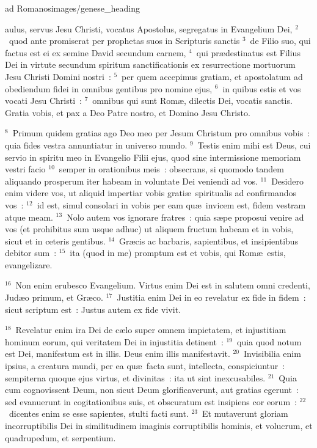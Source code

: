 {ad Romanos}{images/genese_heading}


\bchapter
{}aulus, servus Jesu Christi, vocatus Apostolus, segregatus in Evangelium Dei,
${}^{2}$~quod ante promiserat per prophetas suos in Scripturis sanctis
${}^{3}$~de Filio suo, qui factus est ei ex semine David secundum carnem,
${}^{4}$~qui pr\ae destinatus est Filius Dei in virtute secundum spiritum sanctificationis ex resurrectione mortuorum Jesu Christi Domini nostri~:
${}^{5}$~per quem accepimus gratiam, et apostolatum ad obediendum fidei in omnibus gentibus pro nomine ejus,
${}^{6}$~in quibus estis et vos vocati Jesu Christi~:
${}^{7}$~omnibus qui sunt Rom\ae , dilectis Dei, vocatis sanctis. Gratia vobis, et pax a Deo Patre nostro, et Domino Jesu Christo.


${}^{8}$~Primum quidem gratias ago Deo meo per Jesum Christum pro omnibus vobis~: quia fides vestra annuntiatur in universo mundo.
${}^{9}$~Testis enim mihi est Deus, cui servio in spiritu meo in Evangelio Filii ejus, quod sine intermissione memoriam vestri facio
${}^{10}$~semper in orationibus meis~: obsecrans, si quomodo tandem aliquando prosperum iter habeam in voluntate Dei veniendi ad vos.
${}^{11}$~Desidero enim videre vos, ut aliquid impertiar vobis grati\ae\ spiritualis ad confirmandos vos~:
${}^{12}$~id est, simul consolari in vobis per eam qu\ae\ invicem est, fidem vestram atque meam.
${}^{13}$~Nolo autem vos ignorare fratres~: quia s\ae pe proposui venire ad vos (et prohibitus sum usque adhuc) ut aliquem fructum habeam et in vobis, sicut et in ceteris gentibus.
${}^{14}$~Gr\ae cis ac barbaris, sapientibus, et insipientibus debitor sum~:
${}^{15}$~ita (quod in me) promptum est et vobis, qui Rom\ae\ estis, evangelizare.


${}^{16}$~Non enim erubesco Evangelium. Virtus enim Dei est in salutem omni credenti, Jud\ae o primum, et Gr\ae co.
${}^{17}$~Justitia enim Dei in eo revelatur ex fide in fidem~: sicut scriptum est~: Justus autem ex fide vivit.


${}^{18}$~Revelatur enim ira Dei de c\ae lo super omnem impietatem, et injustitiam hominum eorum, qui veritatem Dei in injustitia detinent~:
${}^{19}$~quia quod notum est Dei, manifestum est in illis. Deus enim illis manifestavit.
${}^{20}$~Invisibilia enim ipsius, a creatura mundi, per ea qu\ae\ facta sunt, intellecta, conspiciuntur~: sempiterna quoque ejus virtus, et divinitas~: ita ut sint inexcusabiles.
${}^{21}$~Quia cum cognovissent Deum, non sicut Deum glorificaverunt, aut gratias egerunt~: sed evanuerunt in cogitationibus suis, et obscuratum est insipiens cor eorum~:
${}^{22}$~dicentes enim se esse sapientes, stulti facti sunt.
${}^{23}$~Et mutaverunt gloriam incorruptibilis Dei in similitudinem imaginis corruptibilis hominis, et volucrum, et quadrupedum, et serpentium.


